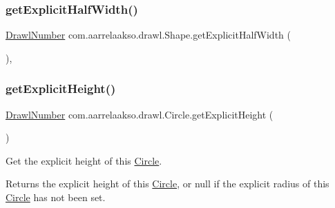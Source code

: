 \subsubsection{\texorpdfstring{get\+Explicit\+Half\+Width()}{getExplicitHalfWidth()}}
{\footnotesize\ttfamily \hyperlink{classcom_1_1aarrelaakso_1_1drawl_1_1_drawl_number}{Drawl\+Number} com.\+aarrelaakso.\+drawl.\+Shape.\+get\+Explicit\+Half\+Width (\begin{DoxyParamCaption}{ }\end{DoxyParamCaption})\hspace{0.3cm}{\ttfamily [protected]}, {\ttfamily [inherited]}}

\mbox{\label{classcom_1_1aarrelaakso_1_1drawl_1_1_circle_a7754ee3923393a342e734a91bd094d25}} 
\subsubsection{\texorpdfstring{get\+Explicit\+Height()}{getExplicitHeight()}}
{\footnotesize\ttfamily \hyperlink{classcom_1_1aarrelaakso_1_1drawl_1_1_drawl_number}{Drawl\+Number} com.\+aarrelaakso.\+drawl.\+Circle.\+get\+Explicit\+Height (\begin{DoxyParamCaption}{ }\end{DoxyParamCaption})}



Get the explicit height of this \hyperlink{classcom_1_1aarrelaakso_1_1drawl_1_1_circle}{Circle}. 

\begin{DoxyReturn}{Returns}
the explicit height of this \hyperlink{classcom_1_1aarrelaakso_1_1drawl_1_1_circle}{Circle}, or {\ttfamily null} if the explicit radius of this \hyperlink{classcom_1_1aarrelaakso_1_1drawl_1_1_circle}{Circle} has not been set. 
\end{DoxyReturn}
\mbox{\label{classcom_1_1aarrelaakso_1_1drawl_1_1_circle_a86dad8314ef32e7561087b43cfcba25a}} 
